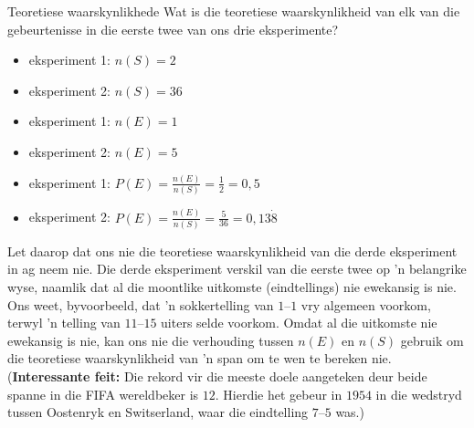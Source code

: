 \begin{wex}{Teoretiese waarskynlikhede}{
Wat is die teoretiese waarskynlikheid van elk van die gebeurtenisse in die eerste twee van ons drie eksperimente?
}{

  \begin{itemize}
  \item[] eksperiment 1: $n(S) = 2$
  \item[] eksperiment 2: $n(S) = 36$
  \end{itemize}
  

  \begin{itemize}
  \item[] eksperiment 1: $n(E) = 1$
  \item[] eksperiment 2: $n(E) = 5$
  \end{itemize}


  \begin{itemize}
  \item[] eksperiment 1: $P(E) = \frac{n(E)}{n(S)} = \frac{1}{2} = 0,5$
  \item[] eksperiment 2: $P(E) = \frac{n(E)}{n(S)} = \frac{5}{36} = 0,13\dot{8}$
  \end{itemize}
}
\end{wex}

Let daarop dat ons nie die teoretiese waarskynlikheid van die derde eksperiment in ag neem nie. Die derde eksperiment verskil van die eerste twee op 'n belangrike wyse, naamlik dat al die moontlike uitkomste (eindtellings) nie ewekansig is nie. Ons weet, byvoorbeeld, dat 'n sokkertelling van $1$--$1$ vry algemeen voorkom, terwyl 'n telling van $11$--$15$ uiters selde voorkom. Omdat al die uitkomste nie ewekansig is nie, kan ons nie die verhouding tussen \(n(E)\) en \(n(S)\) gebruik om die teoretiese waarskynlikheid van 'n span om te wen te bereken nie.
 (\textbf{Interessante feit:} Die rekord vir die meeste doele aangeteken deur beide spanne in die FIFA wereldbeker is $12$. Hierdie het gebeur in $1954$ in die wedstryd tussen Oostenryk en Switserland, waar die eindtelling $7$--$5$ was.)

